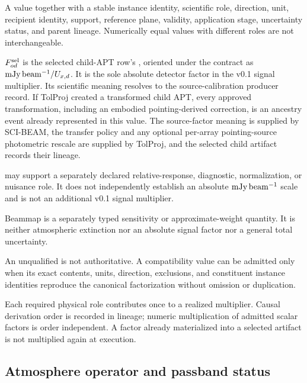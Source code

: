 A value together with a stable instance identity,
scientific role, direction, unit, recipient identity, support, reference
plane, validity, application stage, uncertainty status, and parent lineage.
Numerically equal values with different roles are not interchangeable.

 $F^{\rm sel}_{od}$ is the selected child-APT
row's , oriented under the contract as
\(\mathrm{mJy\,beam^{-1}}/U_{x,d}\). It is the sole absolute detector factor in the v0.1
signal multiplier. Its scientific meaning resolves to the source-calibration
producer record. If TolProj created a transformed child APT, every approved
transformation, including an embodied pointing-derived correction, is an
ancestry event already represented in this value. The source-factor meaning
is supplied by SCI-BEAM, the transfer policy and any optional per-array
pointing-source photometric rescale are supplied by TolProj, and the selected
child artifact records their lineage.

  may support a separately
declared relative-response, diagnostic, normalization, or nuisance role. It
does not independently establish an absolute \(\mathrm{mJy\,beam^{-1}}\) scale and is not an
additional v0.1 signal multiplier.

 Beammap  is a separately typed sensitivity or
approximate-weight quantity. It is neither atmospheric extinction nor an
absolute signal factor nor a general total uncertainty.

 An unqualified  is not authoritative.
A compatibility value can be admitted only when its exact contents, units,
direction, exclusions, and constituent instance identities reproduce the
canonical factorization without omission or duplication.

 Each required physical role contributes once
to a realized multiplier. Causal derivation order is recorded in lineage;
numeric multiplication of admitted scalar factors is order independent. A
factor already materialized into a selected artifact is not multiplied again
at execution.

\subsection{Atmosphere operator and passband status}


